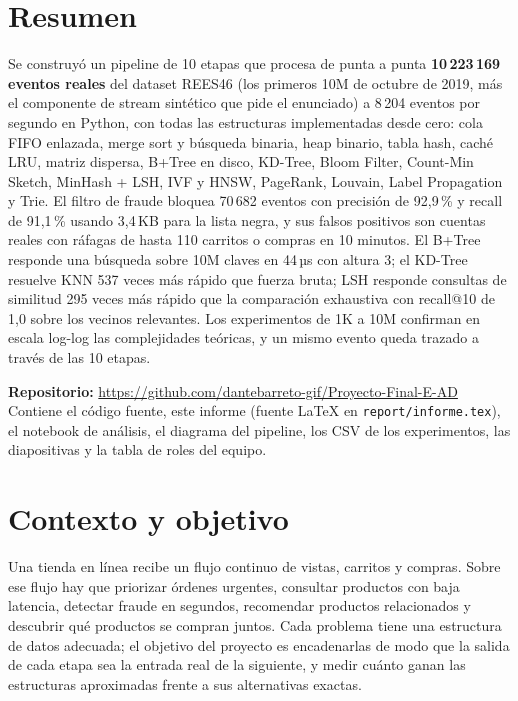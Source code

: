 \documentclass[11pt,letterpaper]{article}
\newcommand{\repo}{https://github.com/dantebarreto-gif/Proyecto-Final-E-AD}
\begin{document}
\tableofcontents
\newpage

\section*{Resumen}

Se construyó un pipeline de 10 etapas que procesa de punta a punta \textbf{10\,223\,169 eventos reales} del dataset REES46 (los primeros 10M de octubre de 2019, más el componente de stream sintético que pide el enunciado) a 8\,204 eventos por segundo en Python, con todas las estructuras implementadas desde cero: cola FIFO enlazada, merge sort y búsqueda binaria, heap binario, tabla hash, caché LRU, matriz dispersa, B+Tree en disco, KD-Tree, Bloom Filter, Count-Min Sketch, MinHash + LSH, IVF y HNSW, PageRank, Louvain, Label Propagation y Trie. El filtro de fraude bloquea 70\,682 eventos con precisión de 92{,}9\,\% y recall de 91{,}1\,\% usando 3{,}4\,KB para la lista negra, y sus falsos positivos son cuentas reales con ráfagas de hasta 110 carritos o compras en 10 minutos. El B+Tree responde una búsqueda sobre 10M claves en 44\,µs con altura 3; el KD-Tree resuelve KNN 537 veces más rápido que fuerza bruta; LSH responde consultas de similitud 295 veces más rápido que la comparación exhaustiva con recall@10 de 1{,}0 sobre los vecinos relevantes. Los experimentos de 1K a 10M confirman en escala log-log las complejidades teóricas, y un mismo evento queda trazado a través de las 10 etapas.

\textbf{Repositorio:} \url{\repo}\\
Contiene el código fuente, este informe (fuente \LaTeX{} en \texttt{report/informe.tex}), el notebook de análisis, el diagrama del pipeline, los CSV de los experimentos, las diapositivas y la tabla de roles del equipo.

\section{Contexto y objetivo}

Una tienda en línea recibe un flujo continuo de vistas, carritos y compras. Sobre ese flujo hay que priorizar órdenes urgentes, consultar productos con baja latencia, detectar fraude en segundos, recomendar productos relacionados y descubrir qué productos se compran juntos. Cada problema tiene una estructura de datos adecuada; el objetivo del proyecto es encadenarlas de modo que la salida de cada etapa sea la entrada real de la siguiente, y medir cuánto ganan las estructuras aproximadas frente a sus alternativas exactas.
\end{document}
